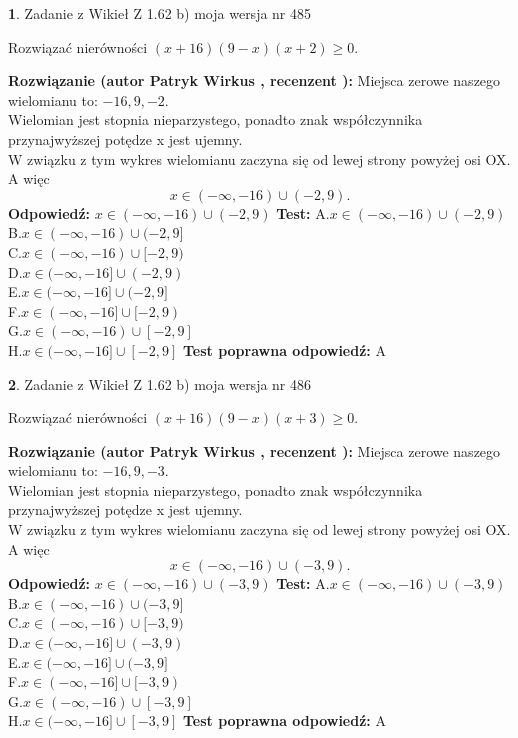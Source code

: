 \documentclass[12pt, a4paper]{article}
\theoremstyle{definition} %
\newtheorem{zad}{}
\newcommand{\zadStart}[1]{\begin{zad}#1\newline}
\newcommand{\zadStop}{\end{zad}}
\newcommand{\rozwStart}[2]{\noindent \textbf{Rozwiązanie (autor #1 , recenzent #2): }\newline}
\newcommand{\rozwStop}{\newline}
\newcommand{\odpStart}{\noindent \textbf{Odpowiedź:}\newline}
\newcommand{\odpStop}{\newline}
\newcommand{\testStart}{\noindent \textbf{Test:}\newline}
\newcommand{\testStop}{\newline}
\newcommand{\kluczStart}{\noindent \textbf{Test poprawna odpowiedź:}\newline}
\newcommand{\kluczStop}{\newline}
\begin{document}
\zadStart{Zadanie z Wikieł Z 1.62 b) moja wersja nr 485}

Rozwiązać nierówności $(x+16)(9-x)(x+2)\ge0$.
\zadStop
\rozwStart{Patryk Wirkus}{}
Miejsca zerowe naszego wielomianu to: $-16, 9, -2$.\\
Wielomian jest stopnia nieparzystego, ponadto znak współczynnika przy\linebreak najwyższej potędze x jest ujemny.\\ W związku z tym wykres wielomianu zaczyna się od lewej strony powyżej osi OX. A więc $$x \in (-\infty,-16) \cup (-2,9).$$
\rozwStop
\odpStart
$x \in (-\infty,-16) \cup (-2,9)$
\odpStop
\testStart
A.$x \in (-\infty,-16) \cup (-2,9)$\\
B.$x \in (-\infty,-16) \cup (-2,9]$\\
C.$x \in (-\infty,-16) \cup [-2,9)$\\
D.$x \in (-\infty,-16] \cup (-2,9)$\\
E.$x \in (-\infty,-16] \cup (-2,9]$\\
F.$x \in (-\infty,-16] \cup [-2,9)$\\
G.$x \in (-\infty,-16) \cup [-2,9]$\\
H.$x \in (-\infty,-16] \cup [-2,9]$
\testStop
\kluczStart
A
\kluczStop



\zadStart{Zadanie z Wikieł Z 1.62 b) moja wersja nr 486}

Rozwiązać nierówności $(x+16)(9-x)(x+3)\ge0$.
\zadStop
\rozwStart{Patryk Wirkus}{}
Miejsca zerowe naszego wielomianu to: $-16, 9, -3$.\\
Wielomian jest stopnia nieparzystego, ponadto znak współczynnika przy\linebreak najwyższej potędze x jest ujemny.\\ W związku z tym wykres wielomianu zaczyna się od lewej strony powyżej osi OX. A więc $$x \in (-\infty,-16) \cup (-3,9).$$
\rozwStop
\odpStart
$x \in (-\infty,-16) \cup (-3,9)$
\odpStop
\testStart
A.$x \in (-\infty,-16) \cup (-3,9)$\\
B.$x \in (-\infty,-16) \cup (-3,9]$\\
C.$x \in (-\infty,-16) \cup [-3,9)$\\
D.$x \in (-\infty,-16] \cup (-3,9)$\\
E.$x \in (-\infty,-16] \cup (-3,9]$\\
F.$x \in (-\infty,-16] \cup [-3,9)$\\
G.$x \in (-\infty,-16) \cup [-3,9]$\\
H.$x \in (-\infty,-16] \cup [-3,9]$
\testStop
\kluczStart
A
\kluczStop
\end{document}
